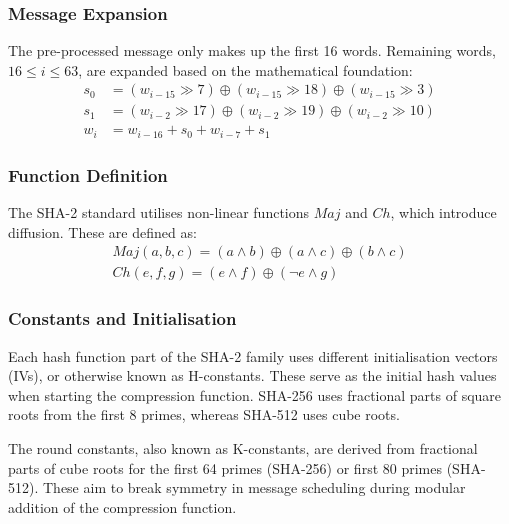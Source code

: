 \documentclass[a4paper]{report}
\begin{document}
\subsubsection{Message Expansion}
\label{ssec:sha2-message-expansion}
The pre-processed message only makes up the first 16 words.
Remaining words, $16 \leq i \leq 63$, are expanded based on the mathematical foundation: \\

\begin{equation}
	\begin{aligned}
		s_0 &= (w_{i - 15} \gg 7) \oplus (w_{i - 15} \gg 18) \oplus (w_{i - 15} \gg 3) \\
		s_1 &= (w_{i - 2} \gg 17) \oplus (w_{i - 2} \gg 19) \oplus (w_{i - 2} \gg 10) \\
		w_i &= w_{i - 16} + s_0 + w_{i - 7} + s_1
	\end{aligned}
\end{equation}

\subsubsection{Function Definition}
\label{ssec:sha2-func-definition}
The SHA-2 standard utilises non-linear functions $Maj$ and $Ch$, which introduce diffusion. These are defined as:
\begin{equation}
	\begin{aligned}
		Maj(a, b, c) = (a \land b) \oplus (a \land c) \oplus (b \land c) \\
		Ch(e, f, g) = (e \land f) \oplus (\neg e \land g)
	\end{aligned}
\end{equation}

\subsubsection{Constants and Initialisation}
Each hash function part of the SHA-2 family uses different initialisation vectors (IVs), or otherwise known as H-constants.
These serve as the initial hash values when starting the compression function.
SHA-256 uses fractional parts of square roots from the first 8 primes, whereas SHA-512 uses cube roots.

The round constants, also known as K-constants, are derived from fractional parts of cube roots for the first 64 primes (SHA-256) or first 80 primes (SHA-512).
These aim to break symmetry in message scheduling during modular addition of the compression function.
\end{document}
